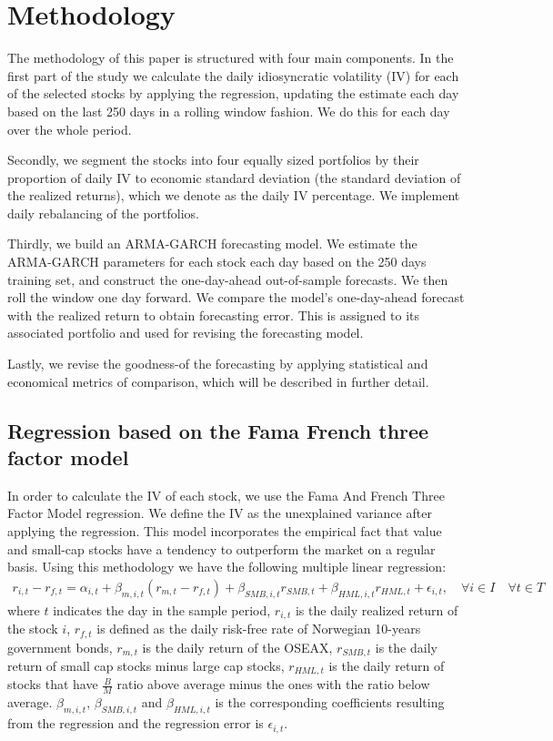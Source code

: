 \chapter{Methodology}

The methodology of this paper is structured with four main components. In the first part of the study we calculate the daily idiosyncratic volatility (IV) for each of the selected stocks by applying the \cite{famafrench} regression, updating the estimate each day based on the last 250 days in a rolling window fashion. We do this for each day over the whole period.

Secondly, we segment the stocks into four equally sized portfolios by their proportion of daily IV to economic standard deviation (the standard deviation of the realized returns), which we denote as the daily IV percentage. We implement daily rebalancing of the portfolios.

Thirdly, we build an ARMA-GARCH forecasting model. We estimate the ARMA-GARCH parameters for each stock each day based on the 250 days training set, and construct the one-day-ahead out-of-sample forecasts. We then roll the window one day forward. We compare the model’s one-day-ahead forecast with the realized return to obtain forecasting error. This is assigned to its associated portfolio and used for revising the forecasting model. 

Lastly, we revise the goodness-of the forecasting by applying statistical and economical metrics of comparison, which will be described in further detail.

\section*{Regression based on the Fama French three factor model} In order to calculate the IV of each stock, we use the Fama And French Three Factor Model regression. We define the IV as the unexplained variance after applying the regression. This model incorporates the empirical fact that value and small-cap stocks have a tendency to outperform the market on a regular basis. Using this methodology we have the following multiple linear regression:
\begin{align} 
    r_{i,t} - r_{f,t}= \alpha_{i,t} + \beta_{m,i,t}(r_{m,t} - r_{f,t}) + \beta_{SMB,i,t}r_{SMB,t} + \beta_{HML,i,t}r_{HML,t} + \epsilon_{i,t}, \quad  \forall i \in I \quad  \forall t \in T 
    \label{FFregression}
\end{align}
where $t$ indicates the day in the sample period, $r_{i,t}$ is the daily realized return of the stock $i$, $r_{f,t}$ is defined as the daily risk-free rate of Norwegian 10-years government bonds, $r_{m,t}$ is the daily return of the OSEAX, $r_{SMB,t}$ is the daily return of small cap stocks minus large cap stocks, $r_{HML,t}$ is the daily return of stocks that have $\frac{B}{M}$ ratio above average minus the ones with the ratio below average. $\beta_{m,i,t}$, $\beta_{SMB,i,t}$ and $\beta_{HML,i,t}$ is the corresponding coefficients resulting from the regression and the regression error is $\epsilon_{i,t}$.

